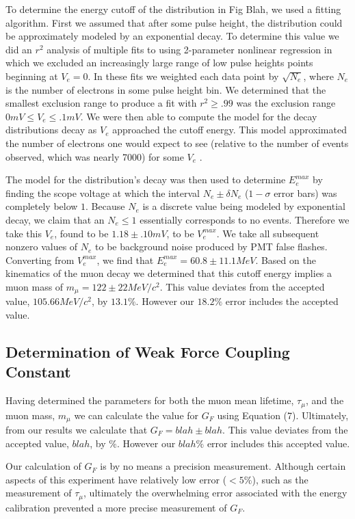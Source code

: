 To determine the energy cutoff of the distribution in Fig Blah, we
used a fitting algorithm.  First we assumed that after some pulse
height, the distribution could be approximately modeled by an
exponential decay.  To determine this value we did an $r^{2}$ analysis
of multiple fits to using 2-parameter nonlinear regression in which we
excluded an increasingly large range of low pulse heights points
beginning at $V_{e}=0$.  In these fits we weighted each data point by
$\sqrt{N_{e}}$, where $N_{e}$ is the number of electrons in some pulse
height bin.  We determined that the smallest exclusion range to
produce a fit with $r^{2}\geq.99$ was the exclusion range $0 mV \leq
V_{e}\leq .1 mV$.  We were then able to compute the model for the
decay distributions decay as $V_{e}$ approached the cutoff energy.
This model approximated the number of electrons one would expect to
see (relative to the number of events observed, which was nearly 7000)
for some $V_{e}$ .

The model for the distribution's decay was then used to determine
$E_{e}^{max}$ by finding the scope voltage at which the interval
$N_{e}\pm \delta N_{e}$ ($1-\sigma$ error bars) was completely below
$1$.  Because $N_{e}$ is a discrete value being modeled by exponential
decay, we claim that an $N_{e} \leq 1$ essentially corresponds to no
events.  Therefore we take this $V_{e}$, found to be $1.18\pm.10 mV$,
to be $V_{e}^{max}$. We take all subsequent nonzero values of $N_{e}$
to be background noise produced by PMT false flashes.  Converting from
$V_{e}^{max}$, we find that $E_{e}^{max}=60.8 \pm 11.1 MeV$.  Based on
the kinematics of the muon decay we determined that this cutoff energy
implies a muon mass of $m_{\mu} = 122 \pm 22 MeV/c^{2}$.  This
value deviates from the accepted value, $105.66 MeV/c^{2}$, by $13.1\%$.
However our $18.2\%$ error includes the accepted value.

\subsection{Determination of Weak Force Coupling Constant}

Having determined the parameters for both the muon mean lifetime, $\tau_{\mu}$, and the muon mass, $m_{\mu}$ we can calculate the value for $G_{F}$ using Equation (7). Ultimately, from our results we calculate that $G_{F}=blah \pm blah$.  This value deviates from the accepted value, $blah$, by $\%$. However our $blah\%$ error includes this accepted value.

Our calculation of $G_F$ is by no means a precision measurement.  Although certain aspects of this experiment have relatively low error ($< 5\%$), such as the measurement of $\tau_{\mu}$, ultimately the overwhelming error associated with the energy calibration prevented a more precise measurement of $G_F$.


